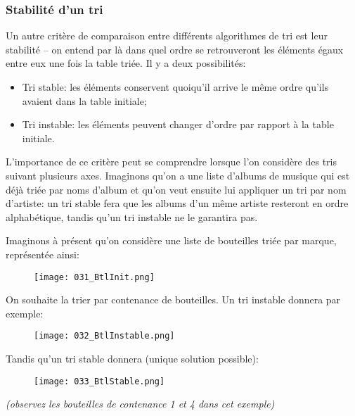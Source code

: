 \documentclass[12pt]{article}
\begin{document}
	\subsubsection*{Stabilité d'un tri}
	Un autre critère de comparaison entre différents algorithmes de tri est leur stabilité -- on entend par là dans quel ordre se retrouveront les éléments égaux entre eux une fois la table triée. Il y a deux possibilités:
	\begin{itemize}
		\item Tri stable: les éléments conservent quoiqu'il arrive le même ordre qu'ils avaient dans la table initiale;
		\item Tri instable: les éléments peuvent changer d'ordre par rapport à la table initiale.
	\end{itemize}
	L'importance de ce critère peut se comprendre lorsque l'on considère des tris suivant plusieurs axes. Imaginons qu'on a une liste d'albums de musique qui est déjà triée par noms d'album et qu'on veut ensuite lui appliquer un tri par nom d'artiste: un tri stable fera que les albums d'un même artiste resteront en ordre alphabétique, tandis qu'un tri instable ne le garantira pas.
	
	Imaginons à présent qu'on considère une liste de bouteilles triée par marque, représentée ainsi:
	\begin{figure}[H]
		\centering
		\texttt{[image: 031\_BtlInit.png]}
	\end{figure}
	
	On souhaite la trier par contenance de bouteilles. Un tri instable donnera par exemple:
	\begin{figure}[H]
		\centering
		\texttt{[image: 032\_BtlInstable.png]}
	\end{figure}
	
	Tandis qu'un tri stable donnera (unique solution possible):
	\begin{figure}[H]
		\centering
		\texttt{[image: 033\_BtlStable.png]}
	\end{figure}
	
	\textit{(observez les bouteilles de contenance 1 et 4 dans cet exemple)}
	
\end{document}
